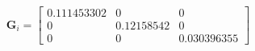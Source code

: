 $$
\mathbf G_i = \left[\begin{matrix}0.111453302 & 0 & 0\\0 & 0.12158542 & 0\\0 & 0 & 0.030396355\end{matrix}\right]
$$
